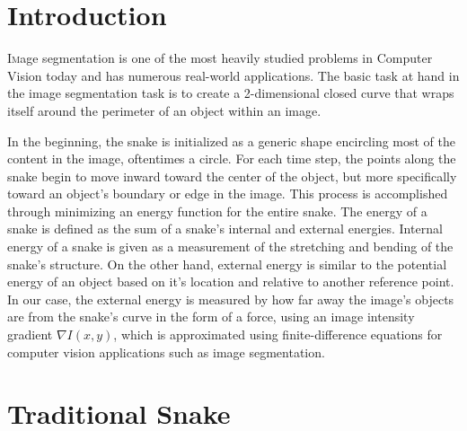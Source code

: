 \documentclass[twoside]{article}
\begin{document}
\begin{multicols}{2} %

\section{Introduction}

\lettrine[nindent=0em,lines=3]{I} mage segmentation is one of the most heavily studied problems in Computer Vision today and has numerous real-world applications. The basic task at hand in the image segmentation task is to create a 2-dimensional closed curve that wraps itself around the perimeter of an object within an image. \par
	In the beginning, the snake is initialized as a generic shape encircling most of the content in the image, oftentimes a circle. For each time step, the points along the snake begin to move inward toward the center of the object, but more specifically toward an object's boundary or edge in the image. This process is accomplished through minimizing an energy function for the entire snake. The energy of a snake is defined as the sum of a snake's internal and external energies. Internal energy of a snake is given as a measurement of the stretching and bending of the snake's structure. On the other hand, external energy is similar to the potential energy of an object based on it's location and relative to another reference point. In our case, the external energy is measured by how far away the image's objects are from the snake's curve in the form of a force, using an image intensity gradient $\nabla I(x,y)$, which is approximated using finite-difference equations for computer vision applications such as image segmentation.



\section{Traditional Snake}


\end{multicols}
\end{document}
